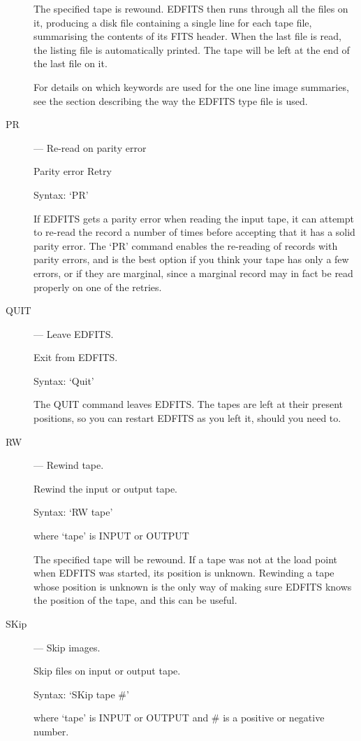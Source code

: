 \begin{description}
The specified tape is rewound.  EDFITS then runs through all the
files on it, producing a disk file containing a single line for 
each tape file, summarising the contents of its FITS header. When
the last file is read, the listing file is automatically printed.
The tape will be left at the end of the last file on it.

For details on which keywords are used for the one line image summaries,
see the section describing the way the EDFITS type file is used.

\item [PR] --- Re-read on parity error

Parity error Retry

Syntax:  `PR'

If EDFITS gets a parity error when reading the input tape, it can
attempt to re-read the record a number of times before accepting
that it has a solid parity error.  The `PR' command enables the 
re-reading of records with parity errors, and is the best option if 
you think your tape has only a few errors, or if they are marginal,
since a marginal record may in fact be read properly on one of the 
retries.

\item [QUIT] --- Leave EDFITS.

Exit from EDFITS.

Syntax:  `Quit'

The QUIT command leaves EDFITS.  The tapes are left at their present
positions, so you can restart EDFITS as you left it, should you need to.

\item [RW] --- Rewind tape.

Rewind the input or output tape.

Syntax:  `RW  tape'      

where `tape' is INPUT or OUTPUT

The specified tape will be rewound.  If a tape was not at the load
point when EDFITS was started, its position is unknown.  Rewinding 
a tape whose position is unknown is the only way of making sure
EDFITS knows the position of the tape, and this can be useful.

\item [SKip] --- Skip images.

Skip files on input or output tape.

Syntax:   `SKip  tape  \#'    

where `tape' is INPUT or OUTPUT and \# is a positive or negative number.


\end{description}
